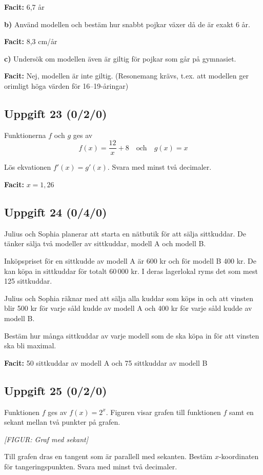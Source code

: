 \documentclass{article}
\begin{document}
\textbf{Facit:} 6,7 år

\textbf{b)} Använd modellen och bestäm hur snabbt pojkar växer då de är exakt 6 år.

\textbf{Facit:} 8,3 cm/år

\textbf{c)} Undersök om modellen även är giltig för pojkar som går på gymnasiet.

\textbf{Facit:} Nej, modellen är inte giltig. (Resonemang krävs, t.ex. att modellen ger orimligt höga värden för 16--19-åringar)

\subsection*{Uppgift 23 (0/2/0)}
Funktionerna $f$ och $g$ ges av
\[
f(x) = \frac{12}{x} + 8 \quad \text{och} \quad g(x) = x
\]

Lös ekvationen $f'(x) = g'(x)$. Svara med minst två decimaler.

\textbf{Facit:} $x = 1,26$

\subsection*{Uppgift 24 (0/4/0)}
Julius och Sophia planerar att starta en nätbutik för att sälja sittkuddar. De tänker sälja två modeller av sittkuddar, modell A och modell B.

Inköpspriset för en sittkudde av modell A är 600 kr och för modell B 400 kr. De kan köpa in sittkuddar för totalt 60\,000 kr. I deras lagerlokal ryms det som mest 125 sittkuddar.

Julius och Sophia räknar med att sälja alla kuddar som köps in och att vinsten blir 500 kr för varje såld kudde av modell A och 400 kr för varje såld kudde av modell B.

Bestäm hur många sittkuddar av varje modell som de ska köpa in för att vinsten ska bli maximal.

\textbf{Facit:} 50 sittkuddar av modell A och 75 sittkuddar av modell B

\subsection*{Uppgift 25 (0/2/0)}
Funktionen $f$ ges av $f(x) = 2^x$. Figuren visar grafen till funktionen $f$ samt en sekant mellan två punkter på grafen.

\textit{[FIGUR: Graf med sekant]}

Till grafen dras en tangent som är parallell med sekanten. Bestäm $x$-koordinaten för tangeringspunkten. Svara med minst två decimaler.
\end{document}
